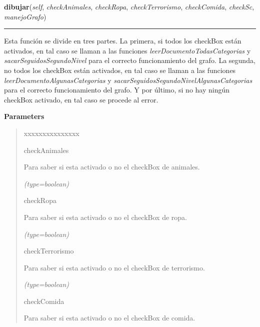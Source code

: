 \hspace{.8\funcindent}\begin{boxedminipage}{\funcwidth}

    \raggedright \textbf{dibujar}(\textit{self}, \textit{checkAnimales}, \textit{checkRopa}, \textit{checkTerrorismo}, \textit{checkComida}, \textit{checkSc}, \textit{manejoGrafo})

    \vspace{-1.5ex}

    \rule{\textwidth}{0.5\fboxrule}
\setlength{\parskip}{2ex}
    Esta función se divide en tres partes. La primera, si todos los 
    checkBox están activados, en tal caso se llaman a las funciones 
    \textit{leerDocumentoTodasCategorias} y 
    \textit{sacarSeguidosSegundoNivel} para el correcto funcionamiento del 
    grafo. La segunda, no todos los checkBox están activados, en tal caso 
    se llaman a las funciones \textit{leerDocumentoAlgunasCategorias} y 
    \textit{sacarSeguidosSegundoNivelAlgunasCategorias} para el correcto 
    funcionamiento del grafo. Y por último, si no hay ningún checkBox 
    activado, en tal caso se procede al error.

\setlength{\parskip}{1ex}
      \textbf{Parameters}
      \vspace{-1ex}

      \begin{quote}
        \begin{Ventry}{xxxxxxxxxxxxxxx}

          \item[checkAnimales]

          Para saber si esta activado o no el checkBox de animales.

            {\it (type=boolean)}

          \item[checkRopa]

          Para saber si esta activado o no el checkBox de ropa.

            {\it (type=boolean)}

          \item[checkTerrorismo]

          Para saber si esta activado o no el checkBox de terrorismo.

            {\it (type=boolean)}

          \item[checkComida]

          Para saber si esta activado o no el checkBox de comida.


\end{Ventry}
\end{quote}
\end{boxedminipage}
